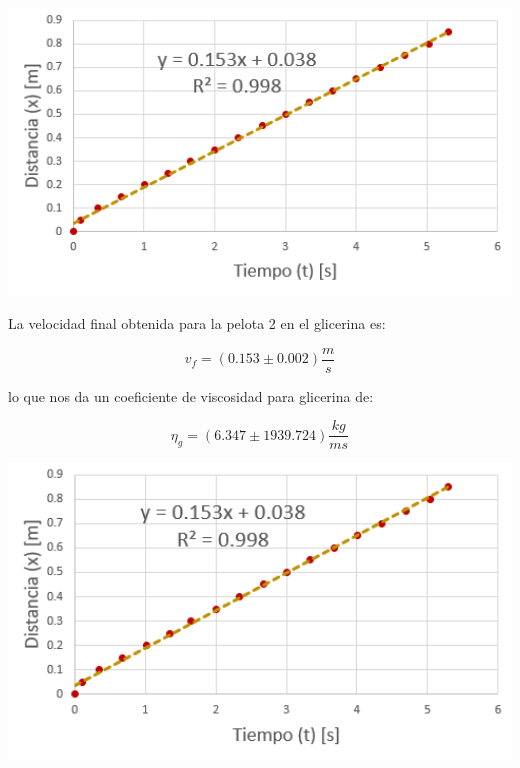 \documentclass[DIV=calc, paper=a4, fontsize=11pt]{scrartcl}
\newenvironment{Figura}
  {\par\medskip\noindent\minipage{\linewidth}}
  {\endminipage\par\medskip}
\begin{document}
\begin{multicols}{2}
\begin{Figura}
\centering
    \includegraphics[width=1\textwidth]{graficas/2 glicerina.PNG}
    \label{fig}
\end{Figura}

La velocidad final obtenida para la pelota 2 en el glicerina es:

\begin{equation*}
    v_f = (0.153 \pm 0.002) \frac{m}{s}
\end{equation*}

lo que nos da un coeficiente de viscosidad para glicerina de:

\begin{equation*}
    \eta_{g} = (6.347 \pm 1939.724) \frac{kg}{ms}
\end{equation*}


\begin{Figura}
\centering
    \includegraphics[width=1\textwidth]{graficas/4 glicerina.PNG}
    \label{fig}
\end{Figura}


\end{multicols}
\end{document}
